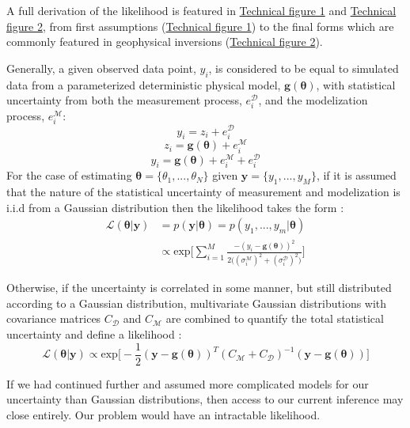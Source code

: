 A full derivation of the likelihood is featured in \hyperref[tf1]{Technical figure 1} and \hyperref[tf1]{Technical figure 2}, from first assumptions (\hyperref[tf1]{Technical figure 1}) to the final forms which are commonly featured in geophysical inversions (\hyperref[tf1]{Technical figure 2}).\par

Generally, a given observed data point, $y_i$, is considered to be equal to simulated data from a parameterized deterministic physical model, $\bm{g}(\bm{\theta})$, with statistical uncertainty from both the measurement process, $e^{\mathcal{D}}_i$, and the modelization process, $e^{\mathcal{M}}_i$:
\begin{equation}
y_i = z_i + e^{\mathcal{D}}_i
\end{equation}
\begin{equation}
z_i = \bm{g}(\bm{\theta}) + e^{\mathcal{M}}_i
\end{equation}
\begin{equation}
y_i = \bm{g}(\bm{\theta}) + e^{\mathcal{M}}_i + e^{\mathcal{D}}_i
\end{equation}
For the case of estimating $\bm{\theta} = \{\theta_1,...,\theta_N\}$ given $\bm{y} = \{y_1,...,y_M\}$, if it is assumed that the nature of the statistical uncertainty of measurement and modelization is i.i.d from a Gaussian distribution then the likelihood takes the form \citet[p.91-92]{gregory2005bayesian}: 
\begin{equation}
\begin{split}
\mathcal{L}(\bm{\theta}|\bm{y}) &= p(\bm{y}|\bm{\theta}) = p(y_1,...,y_m|\bm{\theta})\\
&\propto  \text{exp}\bigg[\sum_{i = 1}^{M}\frac{-(y_i-\bm{g}({\bm{\theta}}))^2}{2\big((\sigma^{\mathcal{M}}_i)^2+(\sigma^{\mathcal{D}}_i)^2\big)}\bigg]
\end{split}
\label{likelihood-1}
\end{equation}



Otherwise, if the uncertainty is correlated in some manner, but still distributed according to a Gaussian distribution, multivariate Gaussian distributions with covariance matrices $C_{\mathcal{D}}$ and $C_{\mathcal{M}}$ are combined to quantify the total statistical uncertainty and define a likelihood \citet[p.35-36]{Tarantola2005}:
\begin{equation}
\mathcal{L}(\bm{\theta}|\bm{y}) \propto \text{exp}\bigg[-\frac{1}{2}(\bm{y}-\bm{g}(\bm{\theta}))^T(C_{\mathcal{M}}+C_{\mathcal{D}})^{-1}(\bm{y}-\bm{g}(\bm{\theta}))\bigg]
\label{likelihood-2}
\end{equation}
\newpage

If we had continued further and assumed more complicated models for our uncertainty than Gaussian distributions, then access to our current inference may close entirely. Our problem would have an intractable likelihood.\par

